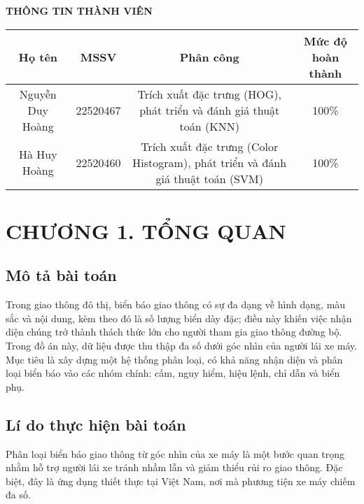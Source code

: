 \documentclass[a4paper,12pt]{article}
\begin{document}
\newpage
\thispagestyle{empty}
\begin{center}
    \textbf{\large THÔNG TIN THÀNH VIÊN}  %
\end{center}

\begin{center}
\begin{tabular}{|c|c|c|c|}
\hline
\textbf{Họ tên} & \textbf{MSSV} & \textbf{Phân công} & \textbf{Mức độ hoàn thành} \\
\hline
Nguyễn Duy Hoàng & 22520467 & \parbox{5cm}{\centering Trích xuất đặc trưng (HOG), phát triển và đánh giá thuật toán (KNN)} & 100\% \\
\hline
Hà Huy Hoàng & 22520460 & \parbox{5cm}{\centering Trích xuất đặc trưng (Color Histogram), phát triển và đánh giá thuật toán (SVM)} & 100\% \\
\hline
\end{tabular}
\end{center}

\newpage
\setcounter{page}{1}
\pagestyle{plain}
\section*{\centering CHƯƠNG 1. TỔNG QUAN}
\vspace{1cm}
\setcounter{section}{1}
\subsection{Mô tả bài toán}
\hspace{5mm}Trong giao thông đô thị, biển báo giao thông có sự đa dạng về hình dạng, màu sắc và nội dung, kèm theo đó là số lượng biển dày đặc; điều này khiến việc nhận diện chúng trở thành thách thức lớn cho người tham gia giao thông đường bộ. Trong đồ án này, dữ liệu được thu thập đa số dưới góc nhìn của người lái xe máy. Mục tiêu là xây dựng một hệ thống phân loại, có khả năng nhận diện và phân loại biển báo vào các nhóm chính: cấm, nguy hiểm, hiệu lệnh, chỉ dẫn và biển phụ.  

\subsection{Lí do thực hiện bài toán}
\hspace{5mm}Phân loại biển báo giao thông từ góc nhìn của xe máy là một bước quan trọng nhằm hỗ trợ người lái xe tránh nhầm lẫn và giảm thiểu rủi ro giao thông. Đặc biệt, đây là ứng dụng thiết thực tại Việt Nam, nơi mà phương tiện xe máy chiếm đa số.  
\end{document}
